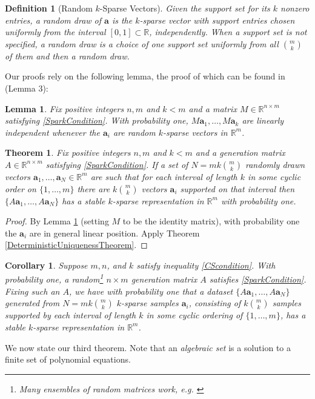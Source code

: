 \documentclass[journal, onecolumn]{IEEEtran}
\newtheorem{theorem}{Theorem}
\newtheorem{lemma}{Lemma}
\newtheorem{definition}{Definition}
\newtheorem{corollary}{Corollary}
\begin{document}
\begin{definition}[Random $k$-Sparse Vectors]\label{RandomDraw}
Given the support set for its $k$ nonzero entries, a random draw of $\mathbf{a}$ is the $k$-sparse vector with support entries chosen uniformly from the interval $[0, 1] \subset \mathbb{R}$, independently. When a support set is not specified, a random draw is a choice of one support set uniformly from all ${m \choose k}$ of them and then a random draw.
\end{definition}

Our proofs rely on the following lemma, the proof of which can be found in \cite{HS11} (Lemma 3):
\begin{lemma}\label{HS11lemma2}
Fix positive integers $n, m$ and $k < m$ and a matrix $M \in \mathbb{R}^{n \times m}$ satisfying \eqref{SparkCondition}. With probability one, $M\mathbf{a}_1, \ldots, M\mathbf{a}_k$ are linearly independent whenever the $\mathbf{a}_i$ are random $k$-sparse vectors in $\mathbb{R}^m$.
\end{lemma}

\begin{theorem}\label{Theorem2}
Fix positive integers $n, m$ and $k < m$ and a generation matrix $A \in \mathbb{R}^{n \times m}$ satisfying \eqref{SparkCondition}. If a set of $N = mk{m \choose k}$ randomly drawn vectors $\mathbf{a}_1, \ldots, \mathbf{a}_N \in \mathbb{R}^m$ are such that for each interval of length $k$ in some cyclic order on $\{1, \ldots, m\}$ there are $k{m \choose k}$ vectors $\mathbf{a}_i$ supported on that interval then $\{A\mathbf{a}_1, \ldots, A\mathbf{a}_N\}$ has a stable $k$-sparse representation in $\mathbb{R}^m$ with probability one.
\end{theorem}

\begin{proof}
By Lemma \ref{HS11lemma2} (setting $M$ to be the identity matrix), with probability one the $\mathbf{a}_i$ are in general linear position. Apply Theorem \ref{DeterministicUniquenessTheorem}.
\end{proof} 

\begin{corollary}
Suppose $m, n$, and $k$ satisfy inequality \eqref{CScondition}. With probability one, a random\footnote{Many ensembles of random matrices work, e.g. \cite{??}} $n \times m$ generation matrix $A$ satisfies \eqref{SparkCondition}. Fixing such an $A$, we have with probability one that a dataset $\{A\mathbf{a}_1, \ldots , A\mathbf{a}_N\}$ generated from $N = mk{m \choose k}$ $k$-sparse samples $\mathbf{a}_i$, consisting of $k{m \choose k}$ samples supported by each interval of length $k$ in some cyclic ordering of $\{1, \ldots, m\}$, has a stable $k$-sparse representation in $\mathbb{R}^m$.
\end{corollary}
We now state our third theorem. Note that an \emph{algebraic set} is a solution to a finite set of polynomial equations. 
\end{document}
